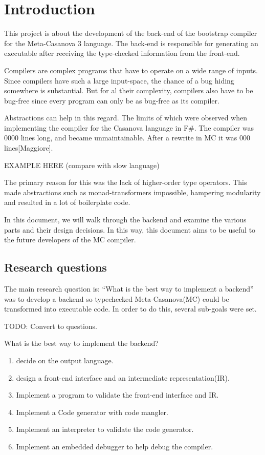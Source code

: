 \section{Introduction}
This project is about the development of the back-end of the bootstrap compiler for the Meta-Casanova 3 language.
The back-end is responsible for generating an executable after receiving the type-checked information from the front-end.

Compilers are complex programs that have to operate on a wide range of inputs.
Since compilers have such a large input-space, the chance of a bug hiding somewhere is substantial. 
But for al their complexity, compilers also have to be bug-free since every program can only be as bug-free as its compiler.

Abstractions can help in this regard.
The limits of which were observed when implementing the compiler for the Casanova language in F\#.
The compiler was 0000 lines long, and became unmaintainable.
After a rewrite in MC it was 000 lines[Maggiore].

EXAMPLE HERE (compare with slow language)

The primary reason for this was the lack of higher-order type operators.
This made abstractions such as monad-transformers impossible, hampering modularity and resulted in a lot of boilerplate code.

In this document, we will walk through the backend and examine the various parts and their design decisions.
In this way, this document aims to be useful to the future developers of the MC compiler.

\subsection{Research questions}

The main research question is: ``What is the best way to implement a backend''  was to develop a backend so typechecked Meta-Casanova(MC) could be transformed into executable code.
In order to do this, several sub-goals were set.

TODO: Convert to questions.

What is the best way to implement the backend?

\begin{enumerate}
    \item decide on the output language.
    \item design a front-end interface and an intermediate representation(IR).
    \item Implement a program to validate the front-end interface and IR.
    \item Implement a Code generator with code mangler.
    \item Implement an interpreter to validate the code generator.
    \item Implement an embedded debugger to help debug the compiler.
\end{enumerate}


